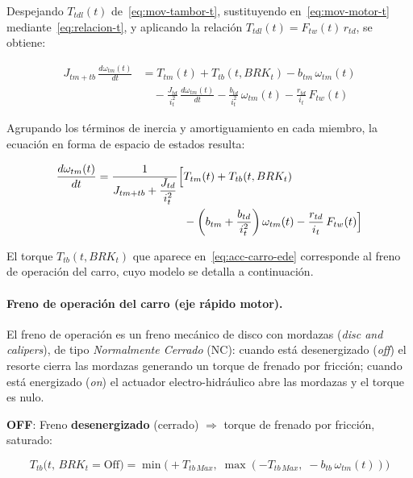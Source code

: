 \documentclass[12pt, a4paper]{article}
\begin{document}
Despejando $T_{tdl}(t)$ de~\eqref{eq:mov-tambor-t}, sustituyendo en~\eqref{eq:mov-motor-t}
mediante~\eqref{eq:relacion-t}, y aplicando la relación $T_{tdl}(t) = F_{tw}(t)\,r_{td}$,
se obtiene:

\begin{equation}
\begin{split}
    J_{tm+tb}\,\frac{d\omega_{tm}(t)}{dt} &= T_{tm}(t) + T_{tb}(t,BRK_t) - b_{tm}\,\omega_{tm}(t) \\[4pt]
    &\quad - \frac{J_{td}}{i_t^2}\,\frac{d\omega_{tm}(t)}{dt}
             - \frac{b_{td}}{i_t^2}\,\omega_{tm}(t)
             - \frac{r_{td}}{i_t}\,F_{tw}(t)
\end{split}
\end{equation}

Agrupando los términos de inercia y amortiguamiento en cada miembro, la ecuación en forma
de espacio de estados resulta:

\begin{equation}
    \label{eq:acc-carro-ede}
\begin{split}
    \frac{d\omega_{tm}(t)}{dt} = \frac{1}{J_{tm+tb}+\dfrac{J_{td}}{i_t^2}}
    \Bigl[&T_{tm}(t) + T_{tb}(t,BRK_t) \\
          &- \left(b_{tm}+\frac{b_{td}}{i_t^2}\right)\omega_{tm}(t)
           - \frac{r_{td}}{i_t}\,F_{tw}(t)\Bigr]
\end{split}
\end{equation}

El torque $T_{tb}(t, BRK_t)$ que aparece en~\eqref{eq:acc-carro-ede} corresponde al freno de
operación del carro, cuyo modelo se detalla a continuación.

\paragraph{Freno de operación del carro (eje rápido motor).}

El freno de operación es un freno mecánico de disco con mordazas (\textit{disc and calipers}),
de tipo \textit{Normalmente Cerrado} (NC): cuando está desenergizado (\textit{off}) el resorte
cierra las mordazas generando un torque de frenado por fricción; cuando está energizado
(\textit{on}) el actuador electro-hidráulico abre las mordazas y el torque es nulo.

\medskip
\noindent\textbf{OFF}: Freno \textbf{desenergizado} (cerrado) $\Rightarrow$ torque de
frenado por fricción, saturado:

\begin{equation}
    \label{eq:freno-t-off}
    T_{tb}\bigl(t,\,BRK_t = \text{Off}\bigr)
    = \min\!\bigl(+T_{tb\,Max},\;\max(-T_{tb\,Max},\;-b_{tb}\,\omega_{tm}(t))\bigr)
\end{equation}
\end{document}

